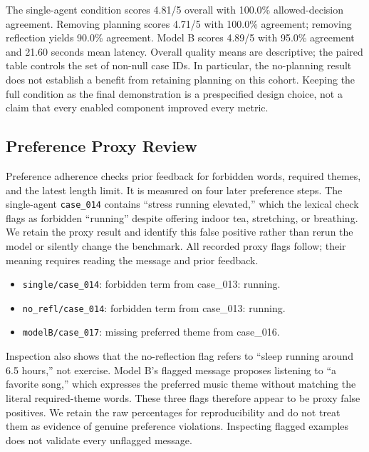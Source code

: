 \documentclass{article}
\begin{document}
The single-agent condition scores 4.81/5 overall with 100.0\% allowed-decision agreement. Removing planning scores 4.71/5 with 100.0\% agreement; removing reflection yields 90.0\% agreement. Model B scores 4.89/5 with 95.0\% agreement and 21.60 seconds mean latency. Overall quality means are descriptive; the paired table controls the set of non-null case IDs. In particular, the no-planning result does not establish a benefit from retaining planning on this cohort. Keeping the full condition as the final demonstration is a prespecified design choice, not a claim that every enabled component improved every metric.

\subsection{Preference Proxy Review}
Preference adherence checks prior feedback for forbidden words, required themes, and the latest length limit. It is measured on four later preference steps. The single-agent \texttt{case\_014} contains ``stress running elevated,'' which the lexical check flags as forbidden ``running'' despite offering indoor tea, stretching, or breathing. We retain the proxy result and identify this false positive rather than rerun the model or silently change the benchmark. All recorded proxy flags follow; their meaning requires reading the message and prior feedback.
\begin{itemize}
\item \texttt{single/case\_014}: forbidden term from case\_013: running.
\item \texttt{no\_refl/case\_014}: forbidden term from case\_013: running.
\item \texttt{modelB/case\_017}: missing preferred theme from case\_016.
\end{itemize}
Inspection also shows that the no-reflection flag refers to ``sleep running around 6.5 hours,'' not exercise. Model B's flagged message proposes listening to ``a favorite song,'' which expresses the preferred music theme without matching the literal required-theme words. These three flags therefore appear to be proxy false positives. We retain the raw percentages for reproducibility and do not treat them as evidence of genuine preference violations. Inspecting flagged examples does not validate every unflagged message.
\end{document}
